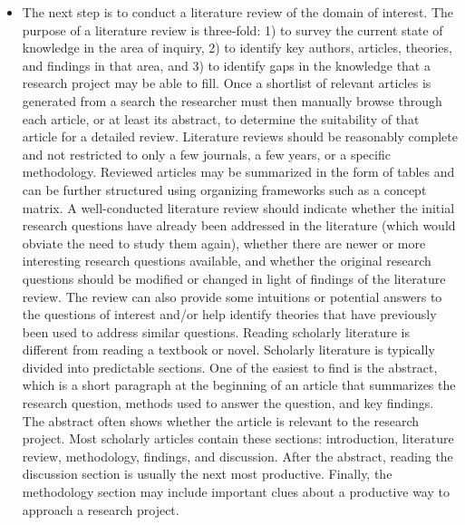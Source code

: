 \begin{enumerate}
\begin{itemize}
	\item The next step is to conduct a literature review of the domain of interest. The purpose of a literature review is three-fold: 1) to survey the current state of knowledge in the area of inquiry, 2) to identify key authors, articles, theories, and findings in that area, and 3) to identify gaps in the knowledge that a research project may be able to fill.  Once a shortlist of relevant articles is generated from a search the researcher must then manually browse through each article, or at least its abstract, to determine the suitability of that article for a detailed review. Literature reviews should be reasonably complete and not restricted to only a few journals, a few years, or a specific methodology. Reviewed articles may be summarized in the form of tables and can be further structured using organizing frameworks such as a concept matrix. A well-conducted literature review should indicate whether the initial research questions have already been addressed in the literature (which would obviate the	need to study them again), whether there are newer or more interesting research questions available, and whether the original research questions should be modified or changed in light of findings of the literature review. The review can also provide some intuitions or potential answers to the questions of interest and/or help identify theories that have previously been	used to address similar questions. Reading scholarly literature is different from reading a textbook or novel. Scholarly literature is typically divided into predictable sections. One of the easiest to find is the abstract, which is a short paragraph at the beginning of an article that summarizes the research question, methods used to answer the question, and key findings. The abstract often shows whether the article is relevant to the research project. Most scholarly articles contain these sections: introduction, literature review, methodology, findings, and discussion. After the abstract, reading the discussion section is usually the next most productive. Finally, the methodology section may include important clues about a productive way to approach a research project.
	

\end{itemize}
\end{enumerate}
